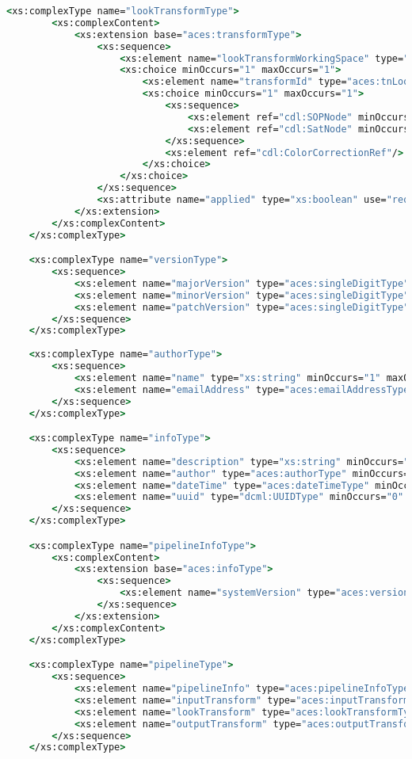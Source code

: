 \begin{lstlisting}[language=csh]
	<xs:complexType name="lookTransformType">
		<xs:complexContent>
			<xs:extension base="aces:transformType">
				<xs:sequence>
					<xs:element name="lookTransformWorkingSpace" type="aces:lookTransformWorkingSpaceType" minOccurs="1" maxOccurs="1"/>
					<xs:choice minOccurs="1" maxOccurs="1">
						<xs:element name="transformId" type="aces:tnLookTransform" minOccurs="1" maxOccurs="1"/>
						<xs:choice minOccurs="1" maxOccurs="1">
							<xs:sequence>
								<xs:element ref="cdl:SOPNode" minOccurs="1" maxOccurs="1"/>
								<xs:element ref="cdl:SatNode" minOccurs="1" maxOccurs="1"/>
							</xs:sequence>
							<xs:element ref="cdl:ColorCorrectionRef"/>
						</xs:choice>
					</xs:choice>
				</xs:sequence>
				<xs:attribute name="applied" type="xs:boolean" use="required"/>
			</xs:extension>
		</xs:complexContent>
	</xs:complexType>

	<xs:complexType name="versionType">
		<xs:sequence>
			<xs:element name="majorVersion" type="aces:singleDigitType" minOccurs="1" maxOccurs="1"/>
			<xs:element name="minorVersion" type="aces:singleDigitType" minOccurs="1" maxOccurs="1"/>
			<xs:element name="patchVersion" type="aces:singleDigitType" minOccurs="1" maxOccurs="1"/>
		</xs:sequence>
	</xs:complexType>
	
	<xs:complexType name="authorType">
		<xs:sequence>
			<xs:element name="name" type="xs:string" minOccurs="1" maxOccurs="1"/>
			<xs:element name="emailAddress" type="aces:emailAddressType" minOccurs="1" maxOccurs="1"/>
		</xs:sequence>
	</xs:complexType>

	<xs:complexType name="infoType">
		<xs:sequence>
			<xs:element name="description" type="xs:string" minOccurs="0" maxOccurs="1"/>
			<xs:element name="author" type="aces:authorType" minOccurs="0" maxOccurs="unbounded"/>
			<xs:element name="dateTime" type="aces:dateTimeType" minOccurs="1" maxOccurs="1"/>
			<xs:element name="uuid" type="dcml:UUIDType" minOccurs="0" maxOccurs="1"/>
		</xs:sequence>
	</xs:complexType>

	<xs:complexType name="pipelineInfoType">
		<xs:complexContent>
			<xs:extension base="aces:infoType">
				<xs:sequence>
					<xs:element name="systemVersion" type="aces:versionType" minOccurs="1" maxOccurs="1"/>
				</xs:sequence>
			</xs:extension>
		</xs:complexContent>
	</xs:complexType>

	<xs:complexType name="pipelineType">
		<xs:sequence>
			<xs:element name="pipelineInfo" type="aces:pipelineInfoType" minOccurs="1" maxOccurs="1"/>
			<xs:element name="inputTransform" type="aces:inputTransformType" minOccurs="0" maxOccurs="1"/>
			<xs:element name="lookTransform" type="aces:lookTransformType" minOccurs="0" maxOccurs="unbounded" />
			<xs:element name="outputTransform" type="aces:outputTransformType" minOccurs="1" maxOccurs="1"/>
		</xs:sequence>
	</xs:complexType>


\end{lstlisting}
